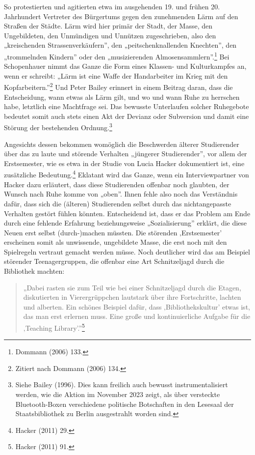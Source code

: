 \documentclass[a4paper,
fontsize=11pt,
oneside,
numbers=noperiodatend,
parskip=half-,
bibliography=totoc,
final
]{scrartcl}
\begin{document}
So protestierten und agitierten etwa im ausgehenden 19. und frühen 20.
Jahrhundert Vertreter des Bürgertums gegen den zunehmenden Lärm auf den
Straßen der Städte. Lärm wird hier primär der Stadt, der Masse, den
Ungebildeten, den Unmündigen und Unnützen zugeschrieben, also den
„kreischenden Strassenverkäufern'', den „peitschenknallenden Knechten'',
den „trommelnden Kindern'' oder den „musizierenden
Almosensammlern''.\footnote{Dommann (2006) 133.} Bei Schopenhauer nimmt
das Ganze die Form eines Klassen- und Kulturkampfes an, wenn er
schreibt: „Lärm ist eine Waffe der Handarbeiter im Krieg mit den
Kopfarbeitern.''\footnote{Zitiert nach Dommann (2006) 134.} Und Peter
Bailey erinnert in einem Beitrag daran, dass die Entscheidung, wann
etwas als Lärm gilt, und wo und wann Ruhe zu herrschen habe, letztlich
eine Machtfrage sei. Das bewusste Unterlaufen solcher Ruhegebote
bedeutet somit auch stets einen Akt der Devianz oder Subversion und
damit eine Störung der bestehenden Ordnung.\footnote{Siehe Bailey
  (1996). Dies kann freilich auch bewusst instrumentalisiert werden, wie
  die Aktion im November 2023 zeigt, als über versteckte Bluetooth-Boxen
  verschiedene politische Botschaften in den Lesesaal der
  Staatsbibliothek zu Berlin ausgestrahlt worden sind.}

Angesichts dessen bekommen womöglich die Beschwerden älterer
Studierender über das zu laute und störende Verhalten „jüngerer
Studierender'', vor allem der Erstsemester, wie es etwa in der Studie
von Lucia Hacker dokumentiert ist, eine zusätzliche
Bedeutung.\footnote{Hacker (2011) 29.} Eklatant wird das Ganze, wenn ein
Interviewpartner von Hacker dazu erläutert, dass diese Studierenden
offenbar noch glaubten, der Wunsch nach Ruhe komme von „oben''. Ihnen
fehle also noch das Verständnis dafür, dass sich die (älteren)
Studierenden selbst durch das nichtangepasste Verhalten gestört fühlen
könnten. Entscheidend ist, dass er das Problem am Ende durch eine
fehlende Erfahrung beziehungsweise „Sozialisierung'' erklärt, die diese
Neuen erst selbst (durch-)machen müssten. Die störenden ‚Erstsemester'
erscheinen somit als unwissende, ungebildete Masse, die erst noch mit
den Spielregeln vertraut gemacht werden müsse. Noch deutlicher wird das
am Beispiel störender Teenagergruppen, die offenbar eine Art
Schnitzeljagd durch die Bibliothek machten:

\begin{quote}
„Dabei rasten sie zum Teil wie bei einer Schnitzeljagd durch die Etagen,
diskutierten in Vierergrüppchen lautstark über ihre Fortschritte,
lachten und alberten. Ein schönes Beispiel dafür, dass
‚Bibliothekskultur' etwas ist, das man erst erlernen muss. Eine große
und kontinuierliche Aufgabe für die ‚Teaching Library'.''\footnote{Hacker
  (2011) 91.}
\end{quote}
\end{document}
